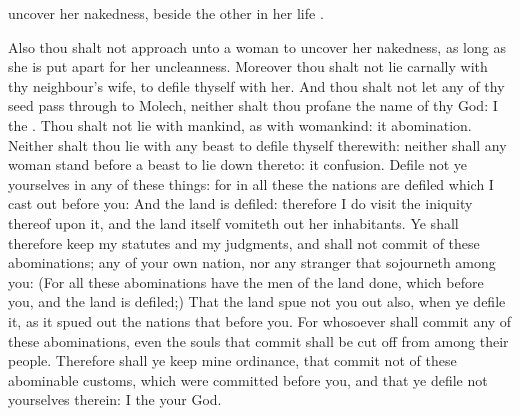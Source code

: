{uncover her
nakedness, beside the other in her
life
{}.
\par }{\PP {}Also thou shalt not
approach unto a
woman to
uncover her
nakedness, as long as she is put
apart for her
uncleanness.
Moreover thou shalt
not
lie
carnally with thy
neighbour’s
wife, to
defile thyself with her.
And thou shalt
not let any of thy
seed
pass through
{} to
Molech, neither shalt thou
profane the
name of thy
God: I
{} the
{}.
Thou shalt not
lie with
mankind, as
with
womankind: it
{}
abomination.
Neither shalt
thou
lie with any
beast to
defile thyself therewith: neither shall any
woman
stand
before a
beast to lie
down thereto: it
{}
confusion.
Defile not ye yourselves in any of these
things: for in all these the
nations are
defiled which I cast
out
before you:
And the
land is
defiled: therefore I do
visit the
iniquity thereof upon it, and the
land itself vomiteth
out her
inhabitants.
Ye shall therefore
keep my
statutes and my
judgments, and shall not
commit
{} of these
abominations;
{} any of your own
nation, nor any
stranger that
sojourneth
among you:
(For all
these
abominations have the
men of the
land
done, which
{}
before you, and the
land is
defiled;)
That the
land spue not you
out also, when ye
defile it, as it spued
out the
nations that
{}
before you.
For whosoever shall
commit any of these
abominations, even the
souls that
commit
{} shall be cut
off from
among their
people.
Therefore shall ye
keep mine
ordinance, that
{}
commit not
{} of these
abominable
customs, which were
committed
before you, and that ye
defile not yourselves therein: I
{} the
{} your
God.

}
